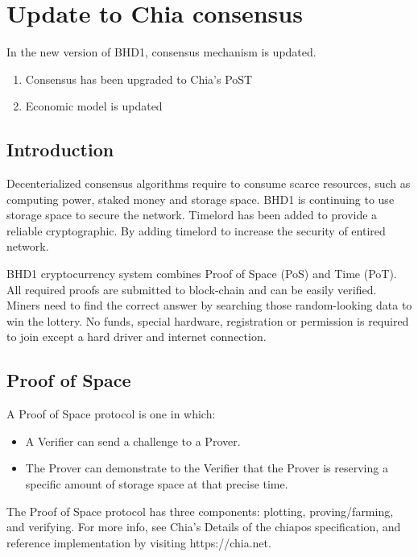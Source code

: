 \chapter{Update to Chia consensus}
\begin{flushleft}
    In the new version of BHD1, consensus mechanism is updated.
    \begin{enumerate}
        \item Consensus has been upgraded to Chia's PoST
        \item Economic model is updated
    \end{enumerate}
\end{flushleft}
\section{Introduction}
\begin{flushleft}
    Decenterialized consensus algorithms require to consume scarce resources, such as computing power, staked money and storage space. BHD1 is continuing to use storage space to secure the network. Timelord has been added to provide a reliable cryptographic. By adding timelord to increase the security of entired network.
\end{flushleft}
\begin{flushleft}
    BHD1 cryptocurrency system combines Proof of Space (PoS) and Time (PoT). All required proofs are submitted to block-chain and can be easily verified. Miners need to find the correct answer by searching those random-looking data to win the lottery. No funds, special hardware, registration or permission is required to join except a hard driver and internet connection.
\end{flushleft}
\section{Proof of Space}
\begin{flushleft}
    A Proof of Space protocol is one in which:
\end{flushleft}
\begin{itemize}
    \item A Verifier can send a challenge to a Prover.
    \item The Prover can demonstrate to the Verifier that the Prover is reserving a specific amount of storage space at that precise time.
\end{itemize}
\begin{flushleft}
    The Proof of Space protocol has three components: plotting, proving/farming, and verifying. For more info, see Chia's Details of the chiapos specification, and reference implementation by visiting https://chia.net.
\end{flushleft}

